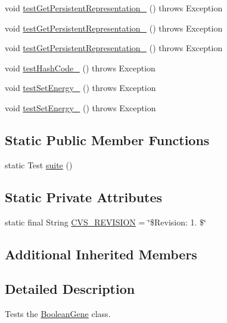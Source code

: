 \begin{DoxyCompactItemize}
void \hyperlink{classorg_1_1jgap_1_1impl_1_1_boolean_gene_test_ae6808c141bb528e4ac1bf0951a20258e}{test\-Get\-Persistent\-Representation\-\_} ()  throws Exception 
\item 
void \hyperlink{classorg_1_1jgap_1_1impl_1_1_boolean_gene_test_a36422f6dd6f02ad062b28b9a7f770c5a}{test\-Get\-Persistent\-Representation\-\_} ()  throws Exception 
\item 
void \hyperlink{classorg_1_1jgap_1_1impl_1_1_boolean_gene_test_a3954195f64f0e6fae5121d8ec3c2e139}{test\-Get\-Persistent\-Representation\-\_} ()  throws Exception 
\item 
void \hyperlink{classorg_1_1jgap_1_1impl_1_1_boolean_gene_test_a2423abc483c18ba0f9069c2dc4540c3f}{test\-Hash\-Code\-\_} ()  throws Exception 
\item 
void \hyperlink{classorg_1_1jgap_1_1impl_1_1_boolean_gene_test_aa64b7484648be18e15b627b0b14a9be5}{test\-Set\-Energy\-\_} ()  throws Exception 
\item 
void \hyperlink{classorg_1_1jgap_1_1impl_1_1_boolean_gene_test_a1ffa7414ec2fda7638d7ef84a54e9f26}{test\-Set\-Energy\-\_} ()  throws Exception 
\end{DoxyCompactItemize}
\subsection*{Static Public Member Functions}
\begin{DoxyCompactItemize}
\item 
static Test \hyperlink{classorg_1_1jgap_1_1impl_1_1_boolean_gene_test_a45524bc7392fe29b8e3916f1fb423078}{suite} ()
\end{DoxyCompactItemize}
\subsection*{Static Private Attributes}
\begin{DoxyCompactItemize}
\item 
static final String \hyperlink{classorg_1_1jgap_1_1impl_1_1_boolean_gene_test_a29015b9bd17fb294aa4c5a1184046bb8}{C\-V\-S\-\_\-\-R\-E\-V\-I\-S\-I\-O\-N} = \char`\"{}\$Revision\-: 1. \$\char`\"{}
\end{DoxyCompactItemize}
\subsection*{Additional Inherited Members}


\subsection{Detailed Description}
Tests the \hyperlink{classorg_1_1jgap_1_1impl_1_1_boolean_gene}{Boolean\-Gene} class.

